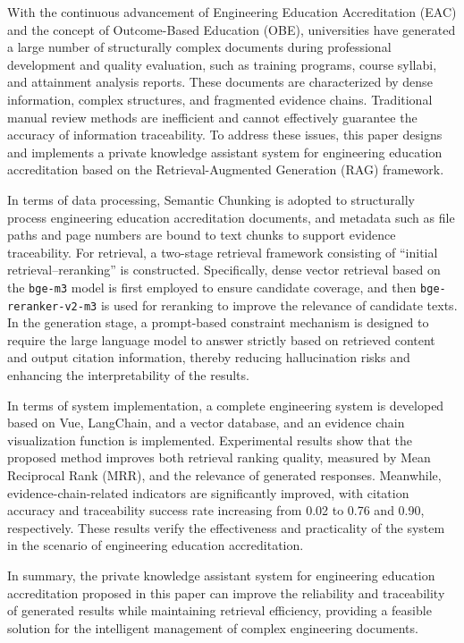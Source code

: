 \documentclass[UTF8,a4paper,zihao=-4]{ctexart}
\begin{document}
{\rmfamily
With the continuous advancement of Engineering Education Accreditation (EAC) and the concept of Outcome-Based Education (OBE), universities have generated a large number of structurally complex documents during professional development and quality evaluation, such as training programs, course syllabi, and attainment analysis reports. These documents are characterized by dense information, complex structures, and fragmented evidence chains. Traditional manual review methods are inefficient and cannot effectively guarantee the accuracy of information traceability. To address these issues, this paper designs and implements a private knowledge assistant system for engineering education accreditation based on the Retrieval-Augmented Generation (RAG) framework.

In terms of data processing, Semantic Chunking is adopted to structurally process engineering education accreditation documents, and metadata such as file paths and page numbers are bound to text chunks to support evidence traceability. For retrieval, a two-stage retrieval framework consisting of ``initial retrieval--reranking'' is constructed. Specifically, dense vector retrieval based on the \texttt{bge-m3} model is first employed to ensure candidate coverage, and then \texttt{bge-reranker-v2-m3} is used for reranking to improve the relevance of candidate texts. In the generation stage, a prompt-based constraint mechanism is designed to require the large language model to answer strictly based on retrieved content and output citation information, thereby reducing hallucination risks and enhancing the interpretability of the results.

In terms of system implementation, a complete engineering system is developed based on Vue, LangChain, and a vector database, and an evidence chain visualization function is implemented. Experimental results show that the proposed method improves both retrieval ranking quality, measured by Mean Reciprocal Rank (MRR), and the relevance of generated responses. Meanwhile, evidence-chain-related indicators are significantly improved, with citation accuracy and traceability success rate increasing from 0.02 to 0.76 and 0.90, respectively. These results verify the effectiveness and practicality of the system in the scenario of engineering education accreditation.

In summary, the private knowledge assistant system for engineering education accreditation proposed in this paper can improve the reliability and traceability of generated results while maintaining retrieval efficiency, providing a feasible solution for the intelligent management of complex engineering documents.
}
\end{document}
